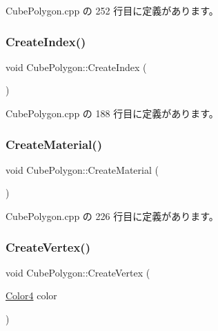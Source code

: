  Cube\+Polygon.\+cpp の 252 行目に定義があります。

\mbox{\label{class_cube_polygon_ade2e155c44798710b8e91ac84b02340f}} 
\subsubsection{\texorpdfstring{Create\+Index()}{CreateIndex()}}
{\footnotesize\ttfamily void Cube\+Polygon\+::\+Create\+Index (\begin{DoxyParamCaption}{ }\end{DoxyParamCaption})\hspace{0.3cm}{\ttfamily [private]}}



 Cube\+Polygon.\+cpp の 188 行目に定義があります。

\mbox{\label{class_cube_polygon_abc3b69a3cb237dec28d0bba9229f0b8d}} 
\subsubsection{\texorpdfstring{Create\+Material()}{CreateMaterial()}}
{\footnotesize\ttfamily void Cube\+Polygon\+::\+Create\+Material (\begin{DoxyParamCaption}{ }\end{DoxyParamCaption})\hspace{0.3cm}{\ttfamily [private]}}



 Cube\+Polygon.\+cpp の 226 行目に定義があります。

\mbox{\label{class_cube_polygon_ae36048a1ae7b13b6bc8571231b372627}} 
\subsubsection{\texorpdfstring{Create\+Vertex()}{CreateVertex()}}
{\footnotesize\ttfamily void Cube\+Polygon\+::\+Create\+Vertex (\begin{DoxyParamCaption}\item[{\mbox{\hyperlink{_vector3_d_8h_a9c2339f516cf07ce4753b8a99fab3791}{Color4}}}]{color }\end{DoxyParamCaption})\hspace{0.3cm}{\ttfamily [private]}}



